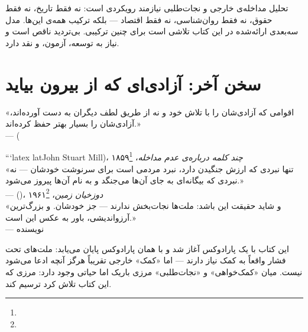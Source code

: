 \begin{tcolorbox}[wavebox, title={پیام به پژوهشگران و تحلیل‌گران}]
تحلیل مداخله‌ی خارجی و نجات‌طلبی نیازمند رویکردی  است: نه فقط تاریخ، نه فقط حقوق، نه فقط روان‌شناسی، نه فقط اقتصاد — بلکه ترکیب همه‌ی این‌ها. مدل سه‌بعدی ارائه‌شده در این کتاب تلاشی است برای چنین ترکیبی. بی‌تردید ناقص است و نیاز به توسعه، آزمون، و نقد دارد.
\end{tcolorbox}


\section{سخن آخر: آزادی‌ای که از بیرون بیاید}
\label{sec:ch14-final-word}


\begin{tcolorbox}[quotebox, title={نقل‌قول پایانی}]
«اقوامی که آزادی‌شان را با تلاش خود و نه از طریق لطف دیگران به دست آورده‌اند، آزادی‌شان را بسیار بهتر حفظ کرده‌اند.»\\
—  (\

```latex
lat{John Stuart Mill})، \textit{چند کلمه درباره‌ی عدم مداخله}، ۱۸۵۹\footnote{}\\[8pt]

«تنها نبردی که ارزش جنگیدن دارد، نبرد مردمی است برای سرنوشت خودشان — نه نبردی که بیگانه‌ای به جای آن‌ها می‌جنگد و به نام آن‌ها پیروز می‌شود.»\\
—  ()، \textit{دوزخیان زمین}، ۱۹۶۱\footnote{}\\[8pt]

«و شاید حقیقت این باشد: ملت‌ها نجات‌بخش ندارند — جز خودشان. و بزرگ‌ترین آرزواندیشی، باور به عکس این است.»\\
— نویسنده
\end{tcolorbox}

\vspace{1cm}

این کتاب با یک پارادوکس آغاز شد و با همان پارادوکس پایان می‌یابد: ملت‌های تحت فشار واقعاً به کمک نیاز دارند — اما «کمک» خارجی تقریباً هرگز آنچه ادعا می‌شود نیست. میان «کمک‌خواهی» و «نجات‌طلبی» مرزی باریک اما حیاتی وجود دارد: مرزی که این کتاب تلاش کرد ترسیم کند.

